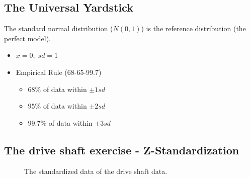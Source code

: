 \documentclass[
  a4paper,
]{scrbook}
\providecommand{\tightlist}{%
  \setlength{\itemsep}{0pt}\setlength{\parskip}{0pt}}\usepackage{longtable,booktabs,array}
\begin{document}
\subsection{The Universal Yardstick}\label{the-universal-yardstick}

The standard normal distribution (\(N(0,1)\)) is the reference
distribution (the perfect model).

\begin{itemize}
\tightlist
\item
  \(\bar{x} = 0,\; sd = 1\)
\item
  Empirical Rule (68-65-99.7)

  \begin{itemize}
  \tightlist
  \item
    \(68\%\) of data within \(\pm1sd\)
  \item
    \(95\%\) of data within \(\pm2sd\)
  \item
    \(99.7\%\) of data within \(\pm3sd\)
  \end{itemize}
\end{itemize}

\subsection{The drive shaft exercise -
Z-Standardization}\label{the-drive-shaft-exercise---z-standardization}

\begin{figure}[H]


\caption{\label{fig-ds-z}The standardized data of the drive shaft data.}

\end{figure}%
\end{document}
